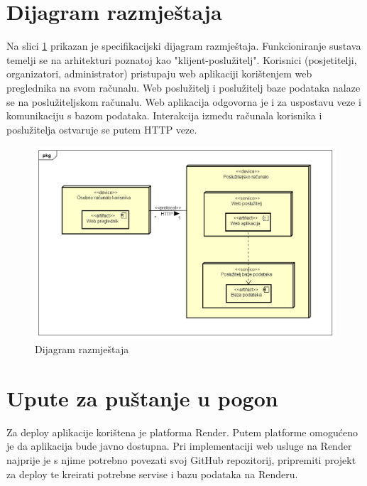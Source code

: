 			
			\eject 
		
		
		\section{Dijagram razmještaja}
		
			Na slici \ref{depd} prikazan je specifikacijski dijagram razmještaja. Funkcioniranje sustava temelji se na arhitekturi poznatoj kao "klijent-poslužitelj". Korisnici (posjetitelji, organizatori, administrator) pristupaju web aplikaciji korištenjem web preglednika na svom računalu. Web poslužitelj i poslužitelj baze podataka nalaze se na poslužiteljskom računalu. Web aplikacija odgovorna je i za uspostavu veze i komunikaciju s bazom podataka. Interakcija između računala korisnika i poslužitelja ostvaruje se putem HTTP veze.
			
			
			\begin{figure}[H]
				\includegraphics[width=\textwidth]{dijagrami/depd.png} 
				\centering
				\vspace{-0.2cm}
				\caption{Dijagram razmještaja}
				\label{depd}
			\end{figure}
			
			
			\eject 
		
		\section{Upute za puštanje u pogon}
		
			
			Za deploy aplikacije korištena je platforma Render. Putem platforme omogućeno je da aplikacija bude javno dostupna. Pri implementaciji web usluge na Render najprije je s njime potrebno povezati svoj GitHub repozitorij, pripremiti projekt za deploy te kreirati potrebne servise i bazu podataka na Renderu.
			
